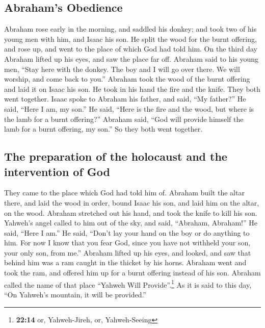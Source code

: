 \hypertarget{abrahams-obedience}{%
\subsection{Abraham's Obedience}\label{abrahams-obedience}}

 Abraham rose early in the morning, and saddled his
donkey; and took two of his young men with him, and Isaac his son. He
split the wood for the burnt offering, and rose up, and went to the
place of which God had told him.  On the third day Abraham
lifted up his eyes, and saw the place far off.  Abraham
said to his young men, ``Stay here with the donkey. The boy and I will
go over there. We will worship, and come back to you.'' 
Abraham took the wood of the burnt offering and laid it on Isaac his
son. He took in his hand the fire and the knife. They both went
together.  Isaac spoke to Abraham his father, and said,
``My father?'' He said, ``Here I am, my son.'' He said, ``Here is the
fire and the wood, but where is the lamb for a burnt offering?''
 Abraham said, ``God will provide himself the lamb for a
burnt offering, my son.'' So they both went together.

\hypertarget{the-preparation-of-the-holocaust-and-the-intervention-of-god}{%
\subsection{The preparation of the holocaust and the intervention of
God}\label{the-preparation-of-the-holocaust-and-the-intervention-of-god}}

 They came to the place which God had told him of. Abraham
built the altar there, and laid the wood in order, bound Isaac his son,
and laid him on the altar, on the wood.  Abraham
stretched out his hand, and took the knife to kill his son.
 Yahweh's angel called to him out of the sky, and said,
``Abraham, Abraham!'' He said, ``Here I am.''  He said,
``Don't lay your hand on the boy or do anything to him. For now I know
that you fear God, since you have not withheld your son, your only son,
from me.''  Abraham lifted up his eyes, and looked, and
saw that behind him was a ram caught in the thicket by his horns.
Abraham went and took the ram, and offered him up for a burnt offering
instead of his son.  Abraham called the name of that
place ``Yahweh Will Provide''.\footnote{\textbf{22:14} or, Yahweh-Jireh,
  or, Yahweh-Seeing} As it is said to this day, ``On Yahweh's mountain,
it will be provided.''

